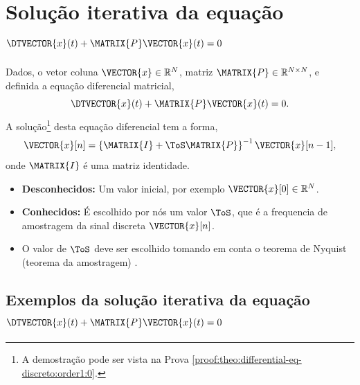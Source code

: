 \section{ Solução iterativa da equação $\DTVECTOR{x}(t) + \MATRIX{P} \VECTOR{x}(t)=0$ }

\begin{theorem}[Equação 
$\DTVECTOR{x}(t) + \MATRIX{P} \VECTOR{x}(t)=0$ com diferenças regressivas:]
\label{theo:differential-eq-discreto:order1:0}
Dados, o vetor coluna $\VECTOR{x} \in \mathbb{R}^N$, matriz $\MATRIX{P} \in \mathbb{R}^{N\times N}$, 
e definida a equação diferencial matricial,
\begin{equation}
\DTVECTOR{x}(t) + \MATRIX{P} \VECTOR{x}(t)=0.
\end{equation}
A solução\footnote{A
demostração pode ser vista na Prova \ref{proof:theo:differential-eq-discreto:order1:0}.} desta equação diferencial tem  a forma,
\begin{equation}
  \VECTOR{x}[n]=\left\{\MATRIX{I} + \ToS \MATRIX{P}\right\}^{-1}\VECTOR{x}[n-1],
\end{equation}
onde $\MATRIX{I}$ é uma matriz identidade.
\begin{itemize}
\item \textbf{Desconhecidos:} Um valor inicial, por exemplo $\VECTOR{x}[0] \in \mathbb{R}^{N}$.
\item  \textbf{Conhecidos:} É escolhido por nós um valor $\ToS$, 
que é a frequencia de amostragem da sinal discreta $\VECTOR{x}[n]$.
\end{itemize}
\end{theorem}

\begin{tcbattention}
\begin{itemize}
\item O valor de $\ToS$ deve ser escolhido tomando em conta o teorema de Nyquist (teorema da amostragem) 
\cite[pp. 67]{rochol2009comunicacao} \cite[pp. 122]{forouzan2009comunicacao}.
\end{itemize}
\end{tcbattention}

\subsection{Exemplos da solução iterativa da equação $\DTVECTOR{x}(t) + \MATRIX{P} \VECTOR{x}(t)=0$}

